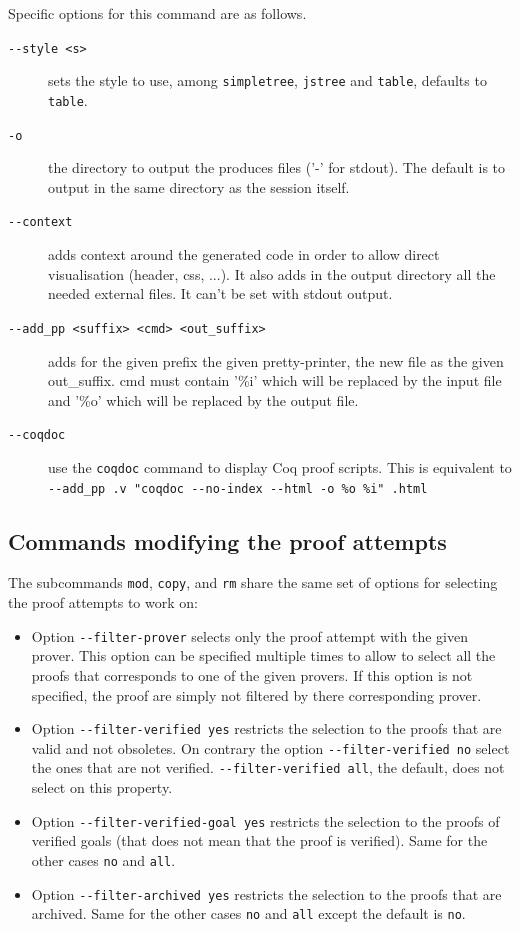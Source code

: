 Specific options for this command are as follows.
\begin{description}
\item[\texttt{-{}-style <s>}] sets the style to use, among
  \texttt{simpletree}, \texttt{jstree} and \texttt{table}, defaults to
  \texttt{table}.

\item[\texttt{-o}] the directory to output the produces files ('-' for
  stdout). The default is to output in the same directory as the session
  itself.

\item[\texttt{-{}-context}] adds context around the generated code in
  order to allow direct visualisation (header, css, ...). It also adds
  in the output directory all the needed external files. It can't be set with
  stdout output.

\item[\texttt{-{}-add\_pp <suffix> <cmd> <out\_suffix>}] adds for the
  given prefix the given pretty-printer, the new file as the given
  out\_suffix. cmd must contain '\%i' which will be replaced by the
  input file and '\%o' which will be replaced by the output file.

\item[\texttt{-{}-coqdoc}] use the \verb|coqdoc| command to display Coq proof
  scripts. This is equivalent to \texttt{-{}-add\_pp .v "coqdoc
    -{}-no-index -{}-html -o \%o \%i" .html}

\end{description}

\subsection{Commands modifying the proof attempts}

The subcommands \texttt{mod}, \texttt{copy}, and \texttt{rm} share the
same set of options for selecting the proof attempts to work on:
\begin{itemize}
\item Option \verb|--filter-prover| selects only the proof attempt with
  the given prover. This option can be specified multiple times to
  allow to select all the proofs that corresponds to one of the given
  provers. If this option is not specified, the proof are simply not
  filtered by there corresponding prover.
\item Option \verb|--filter-verified yes| restricts the selection to
  the proofs that are valid and not obsoletes. On contrary the option
  \verb|--filter-verified no| select the ones that are not verified.
  \verb|--filter-verified all|, the default, does not select on this property.
\item Option \verb|--filter-verified-goal yes| restricts the selection
  to the proofs of verified goals (that does not mean that the proof is
  verified). Same for the other cases \verb|no| and \verb|all|.
\item Option \verb|--filter-archived yes| restricts the selection
  to the proofs that are archived. Same for the other cases \verb|no|
  and \verb|all| except the default is \verb|no|.
\end{itemize}

